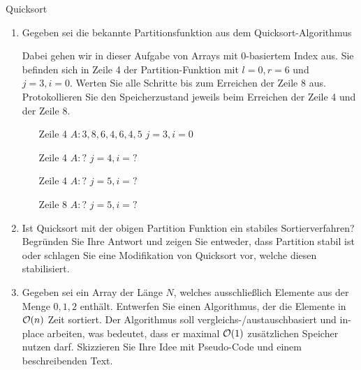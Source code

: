 \documentclass{article}
\begin{document}
\begin{exercise}{Quicksort}
  \begin{enumerate}
    \item
          Gegeben sei die bekannte Partitionsfunktion aus dem Quicksort-Algorithmus
          
          Dabei gehen wir in dieser Aufgabe von Arrays mit 0-basiertem Index aus. Sie befinden sich in Zeile 4 der Partition-Funktion mit $l = 0, r = 6$ und $j = 3, i = 0$. Werten Sie alle Schritte bis zum Erreichen der Zeile 8 aus. Protokollieren Sie den Speicherzustand jeweils beim Erreichen der Zeile 4 und der Zeile 8.
          \begin{itemize}
            \item[Zeile 4] $A: 3, 8, 6, 4, 6, 4, 5$ \hfill $j = 3, i = 0$
            \item[Zeile 4] $A: ?$ \hfill $j = 4, i = ?$
            \item[Zeile 4] $A: ?$ \hfill $j = 5, i = ?$
            \item[Zeile 8] $A: ?$ \hfill $j = 5, i = ?$
          \end{itemize}
    \item Ist Quicksort mit der obigen Partition Funktion ein stabiles Sortierverfahren? Begründen Sie Ihre Antwort und zeigen Sie entweder, dass Partition stabil ist oder schlagen Sie eine Modifikation von Quicksort vor, welche diesen stabilisiert.
    \item Gegeben sei ein Array der Länge $N$, welches ausschließlich Elemente aus der Menge $0,1,2$ enthält. Entwerfen Sie einen Algorithmus, der die Elemente in $\mathcal{O}(n)$ Zeit sortiert. Der Algorithmus soll vergleichs-/austauschbasiert und in-place arbeiten, was bedeutet, dass er maximal $\mathcal{O}(1)$ zusätzlichen Speicher nutzen darf. Skizzieren Sie Ihre Idee mit Pseudo-Code und einem beschreibenden Text.
  \end{enumerate}

  \begin{solution}

  \end{solution}
\end{exercise}
\end{document}

